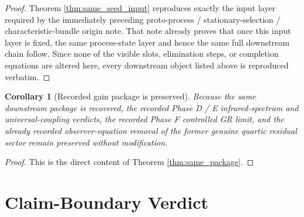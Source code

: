 \documentclass[11pt]{article}
\newtheorem{corollary}{Corollary}
\begin{document}
\begin{proof}
Theorem \ref{thm:same_seed_input} reproduces exactly the input layer required by the immediately preceding proto-process / stationary-selection / characteristic-bundle origin note. That note already proves that once this input layer is fixed, the same process-state layer and hence the same full downstream chain follow. Since none of the visible slots, elimination steps, or completion equations are altered here, every downstream object listed above is reproduced verbatim.
\end{proof}

\begin{corollary}[Recorded gain package is preserved]
\label{cor:gains}
Because the same downstream package is recovered, the recorded Phase D / E infrared-spectrum and universal-coupling verdicts, the recorded Phase F controlled GR limit, and the already recorded observer-equation removal of the former genuine quartic residual sector remain preserved without modification.
\end{corollary}

\begin{proof}
This is the direct content of Theorem \ref{thm:same_package}.
\end{proof}

\section{Claim-Boundary Verdict}
\end{document}
